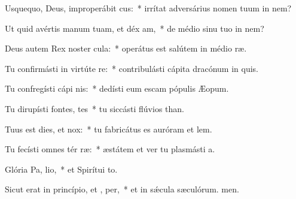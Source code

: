 \item Usquequo, Deus, improperábit cus:~* irrítat adversárius nomen tuum in nem?
\item Ut quid avértis manum tuam, et déx am,~* de médio sinu tuo in nem?
\item Deus autem Rex noster  cula:~* operátus est salútem in médio ræ.
\item Tu confirmásti in virtúte  re:~* contribulásti cápita dracónum in quis.
\item Tu confregísti cápi nis:~* dedísti eum escam pópulis Æopum.
\item Tu dirupísti fontes,  tes~* tu siccásti flúvios than.
\item Tuus est dies, et   nox:~* tu fabricátus es auróram et lem.
\item Tu fecísti omnes tér ræ:~* æstátem et ver tu plasmásti a.
\item Glória Pa,  lio,~* et Spirítui to.
\item Sicut erat in princípio, et ,  per,~* et in sǽcula sæculórum. men.
